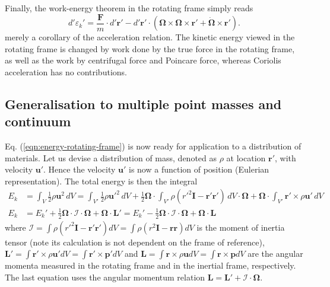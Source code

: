 %
Finally, the work-energy theorem in the rotating frame simply reads
%
\begin{equation}\label{eqn:WET-rotate}
    d' \varepsilon_k' = \frac{\mathbf{F}}{m} \cdot d' \mathbf{r}' - d'\mathbf{r}' \cdot (\boldsymbol{\Omega}\times \boldsymbol{\Omega}\times \mathbf{r}' + \dot{\boldsymbol{\Omega}}\times \mathbf{r}').
\end{equation}
%
merely a corollary of the acceleration relation. The kinetic energy viewed in the rotating frame is changed by work done by the true force in the rotating frame, as well as the work by centrifugal force and Poincare force, whereas Coriolis acceleration has no contributions.


\subsection{Generalisation to multiple point masses and continuum}

Eq. (\ref{eqn:energy-rotating-frame}) is now ready for application to a distribution of materials. Let us devise a distribution of mass, denoted as $\rho$ at location $\mathbf{r}'$, with velocity $\mathbf{u}'$. Hence the velocity $\mathbf{u}'$ is now a function of position (Eulerian representation).
The total energy is then the integral
%
\begin{equation}
\begin{aligned}
    E_k &= \int_V \frac{1}{2}\rho\mathbf{u}^2 \, dV = \int_{V'} \frac{1}{2} \rho \mathbf{u}'^2 \, dV + \frac{1}{2} \boldsymbol{\Omega} \cdot \int_{V'} \rho\left(r'^2 \mathbf{I} - \mathbf{r}'\mathbf{r}'\right)\, dV \cdot \boldsymbol{\Omega} + \boldsymbol{\Omega} \cdot \int_{V'} \mathbf{r}'\times \rho\mathbf{u'} \, dV \\ 
    E_k &= E_k' + \frac{1}{2} \boldsymbol{\Omega} \cdot \mathcal{I} \cdot \boldsymbol{\Omega} + \boldsymbol{\Omega}\cdot \mathbf{L}' = E_k' - \frac{1}{2} \boldsymbol{\Omega} \cdot \mathcal{I} \cdot \boldsymbol{\Omega} + \boldsymbol{\Omega}\cdot \mathbf{L}
\end{aligned}
\end{equation}
%
where $\mathcal{I} = \int \rho (r'^2 \mathbf{I} - \mathbf{r}'\mathbf{r}') dV = \int \rho (r^2 \mathbf{I} - \mathbf{r}\mathbf{r}) dV$ is the moment of inertia tensor (note its calculation is not dependent on the frame of reference), $\mathbf{L}' = \int \mathbf{r}' \times \rho \mathbf{u}' dV = \int \mathbf{r}' \times \mathbf{p}' dV$ and $\mathbf{L} = \int \mathbf{r} \times \rho \mathbf{u} dV = \int \mathbf{r} \times \mathbf{p} dV$ are the angular momenta measured in the rotating frame and in the inertial frame, respectively. The last equation uses the angular momentum relation $\mathbf{L} = \mathbf{L}' + \mathcal{I}\cdot \boldsymbol{\Omega}$.

